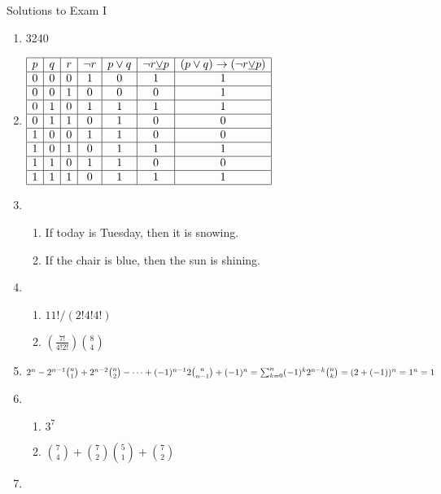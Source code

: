 \pagestyle{empty} \setlength{\topmargin}{-.5in}
\addtolength{\textheight}{2in} \addtolength{\oddsidemargin}{-1in}
\addtolength{\textwidth}{2in} \setlength{\parindent}{0pt}

\Large{Solutions to Exam I
\begin{enumerate}
\item  3240
\item
$\begin{array}{|c|c|c|c|c|c|c|}
 \hline
 p&q&r & \neg r&p \vee q & \neg r {\underline{\vee}} p &  (p \vee q) \rightarrow ( \neg r \underline{\vee} p)\\
 \hline
 0&0&0&1&0&1&1 \\
 \hline
 0&0&1&0&0&0&1 \\
 \hline
 0&1&0&1&1&1&1 \\
 \hline
 0&1&1&0&1&0&0 \\
 \hline
 1&0&0&1&1&0&0 \\
 \hline
 1&0&1&0&1&1&1 \\
 \hline
 1&1&0&1&1&0&0 \\
 \hline
 1&1&1&0&1&1&1 \\
 \hline
 \end{array}$\\
\item  \begin{enumerate} \item If today is Tuesday, then it is snowing.
 \item If the chair is blue, then the sun is shining.
\end{enumerate}
\item \begin{enumerate} \item $11!/(2!4!4!)$
\item $\left( \frac{7!}{4!2!}\right){ 8 \choose 4}$
\end{enumerate}
\item
$2^n -2^{n-1}{n \choose 1}+2^{n-2}{n \choose 2}- \cdots
+(-1)^{n-1}2{n \choose n-1}+(-1)^n \\ = \sum_{k=0}^n (-1)^k2^{n-k} {
n \choose k}  \\ = (2 + (-1))^n =1^n=1 $
\item  \begin{enumerate} \item $3^7$
 \item ${ 7 \choose 4} +{ 7 \choose 2}{5 \choose 1}+{7 \choose 2}$
\end{enumerate}
\item  \begin{enumerate}

\end{enumerate}
\end{enumerate}}
